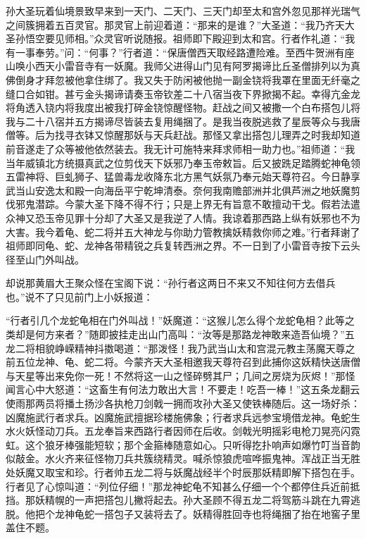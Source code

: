 \documentclass[12pt,UTF8]{ctexbook}
\begin{document}
孙大圣玩着仙境景致早来到一天门、二天门、三天门却至太和宫外忽见那祥光瑞气之间簇拥着五百灵官。那灵官上前迎着道：“那来的是谁？”大圣道：“我乃齐天大圣孙悟空要见师相。”众灵官听说随报。祖师即下殿迎到太和宫。行者作礼道：“我有一事奉劳。”问：“何事？”行者道：“保唐僧西天取经路遭险难。至西牛贺洲有座山唤小西天小雷音寺有一妖魔。我师父进得山门见有阿罗揭谛比丘圣僧排列以为真佛倒身才拜忽被他拿住绑了。我又失于防闲被他抛一副金铙将我罩在里面无纤毫之缝口合如钳。甚亏金头揭谛请奏玉帝钦差二十八宿当夜下界掀揭不起。幸得亢金龙将角透入铙内将我度出被我打碎金铙惊醒怪物。赶战之间又被撒一个白布搭包儿将我与二十八宿并五方揭谛尽皆装去复用绳捆了。是我当夜脱逃救了星辰等众与我唐僧等。后为找寻衣钵又惊醒那妖与天兵赶战。那怪又拿出搭包儿理弄之时我却知道前音遂走了众等被他依然装去。我无计可施特来拜求师相一助力也。”祖师道：“我当年威镇北方统摄真武之位剪伐天下妖邪乃奉玉帝敕旨。后又披跣足踏腾蛇神龟领五雷神将、巨虬狮子、猛兽毒龙收降东北方黑气妖氛乃奉元始天尊符召。今日静享武当山安逸太和殿一向海岳平宁乾坤清泰。奈何我南赡部洲并北俱芦洲之地妖魔剪伐邪鬼潜踪。今蒙大圣下降不得不行；只是上界无有旨意不敢擅动干戈。假若法遣众神又恐玉帝见罪十分却了大圣又是我逆了人情。我谅着那西路上纵有妖邪也不为大害。我今着龟、蛇二将并五大神龙与你助力管教擒妖精救你师之难。”行者拜谢了祖师即同龟、蛇、龙神各带精锐之兵复转西洲之界。不一日到了小雷音寺按下云头径至山门外叫战。

却说那黄眉大王聚众怪在宝阁下说：“孙行者这两日不来又不知往何方去借兵也。”说不了只见前门上小妖报道：

“行者引几个龙蛇龟相在门外叫战！”妖魔道：“这猴儿怎么得个龙蛇龟相？此等之类却是何方来者？”随即披挂走出山门高叫：“汝等是那路龙神敢来造吾仙境？”五龙二将相貌峥嵘精神抖擞喝道：“那泼怪！我乃武当山太和宫混元教主荡魔天尊之前五位龙神、龟、蛇二将。今蒙齐天大圣相邀我天尊符召到此捕你这妖精快送唐僧与天星等出来免你一死！不然将这一山之怪碎劈其尸；几间之房烧为灰烬！”那怪闻言心中大怒道：“这畜生有何法力敢出大言！不要走！吃吾一棒！”这五条龙翻云使雨那两员将播土扬沙各执枪刀剑戟一拥而攻孙大圣又使铁棒随后。这一场好杀：凶魔施武行者求兵。凶魔施武擅据珍楼施佛象；行者求兵远参宝境借龙神。龟蛇生水火妖怪动刀兵。五龙奉旨来西路行者因师在后收。剑戟光明摇彩电枪刀晃亮闪霓虹。这个狼牙棒强能短软；那个金箍棒随意如心。只听得扢扑响声如爆竹叮当音韵似敲金。水火齐来征怪物刀兵共簇绕精灵。喊杀惊狼虎喧哗振鬼神。浑战正当无胜处妖魔又取宝和珍。行者帅五龙二将与妖魔战经半个时辰那妖精即解下搭包在手。行者见了心惊叫道：“列位仔细！”那龙神蛇龟不知甚么仔细一个个都停住兵近前抵挡。那妖精幌的一声把搭包儿撇将起去。孙大圣顾不得五龙二将驾筋斗跳在九霄逃脱。他把个龙神龟蛇一搭包子又装将去了。妖精得胜回寺也将绳捆了抬在地窖子里盖住不题。
\end{document}
